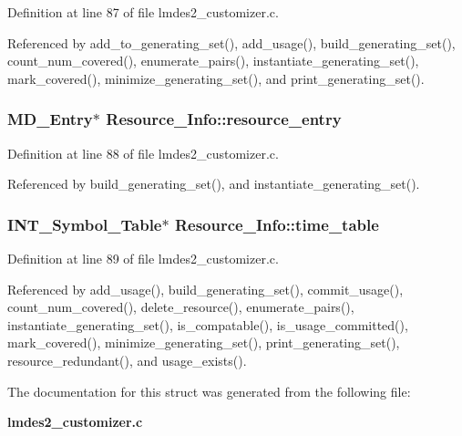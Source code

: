Definition at line 87 of file lmdes2\_\-customizer.c.

Referenced by add\_\-to\_\-generating\_\-set(), add\_\-usage(), build\_\-generating\_\-set(), count\_\-num\_\-covered(), enumerate\_\-pairs(), instantiate\_\-generating\_\-set(), mark\_\-covered(), minimize\_\-generating\_\-set(), and print\_\-generating\_\-set().
\subsubsection{\setlength{\rightskip}{0pt plus 5cm}\bf{MD\_\-Entry}$\ast$ \bf{Resource\_\-Info::resource\_\-entry}}\label{structResource__Info_a13a7304c90dda9445585f943726e69a}




Definition at line 88 of file lmdes2\_\-customizer.c.

Referenced by build\_\-generating\_\-set(), and instantiate\_\-generating\_\-set().
\subsubsection{\setlength{\rightskip}{0pt plus 5cm}\bf{INT\_\-Symbol\_\-Table}$\ast$ \bf{Resource\_\-Info::time\_\-table}}\label{structResource__Info_c445ffe205bc68c63cb5197080e0df73}




Definition at line 89 of file lmdes2\_\-customizer.c.

Referenced by add\_\-usage(), build\_\-generating\_\-set(), commit\_\-usage(), count\_\-num\_\-covered(), delete\_\-resource(), enumerate\_\-pairs(), instantiate\_\-generating\_\-set(), is\_\-compatable(), is\_\-usage\_\-committed(), mark\_\-covered(), minimize\_\-generating\_\-set(), print\_\-generating\_\-set(), resource\_\-redundant(), and usage\_\-exists().

The documentation for this struct was generated from the following file:\begin{CompactItemize}
\item 
\bf{lmdes2\_\-customizer.c}\end{CompactItemize}
